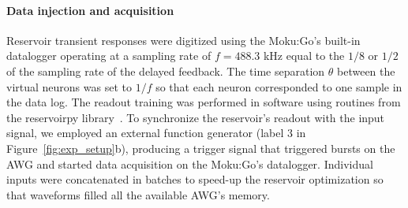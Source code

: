 \documentclass{WileyMSP-template}
\begin{document}
\paragraph{Data injection and acquisition}
Reservoir transient responses were digitized using the Moku:Go's built-in datalogger operating at a sampling rate of $f=488.3$ kHz equal to the $1/8$ or $1/2$ of the sampling rate of the delayed feedback.
The time separation $\theta$ between the virtual neurons was set to $1/f$ so that each neuron corresponded to one sample in the data log.
The readout training was performed in software using routines from the reservoirpy library~\cite{ref:trouvain2020}.
To synchronize the reservoir's readout with the input signal, we employed an external function generator (label 3 in Figure~\ref{fig:exp_setup}b), producing a trigger signal that triggered bursts on the AWG and started data acquisition on the Moku:Go's datalogger.
Individual inputs were concatenated in batches to speed-up the reservoir optimization so that waveforms filled all the available AWG's memory.
\end{document}
